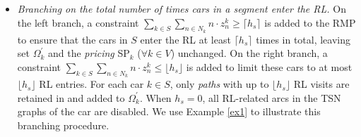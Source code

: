 \documentclass[12pt]{article}
\begin{document}




\begin{itemize}
    \item \textit{Branching on the total number of times cars in a segment enter the RL.} On the left branch, a constraint $\sum_{k\in S}{\sum_{n\in N_k}{n\cdot z^k_n}}\geqslant \lceil h_s\rceil$ is added to the RMP to ensure that the cars in $S$ enter the RL at least $\lceil h_s\rceil$ times in total, leaving set $\Omega^{\prime}_{k}$ and the \textit{pricing} SP$_k$ ($\forall k\in V$) unchanged. On the right branch, a constraint $\sum_{k\in S}{\sum_{n\in N_k}{n\cdot z^k_n}}\leqslant \lfloor h_s\rfloor$ is added to limit these cars to at most $\lfloor h_s \rfloor$ RL entries. For each car $k\in S$, only \textit{paths} with up to $\lfloor h_s \rfloor$ RL visits are retained in and added to $\Omega^{\prime}_{k}$. When $h_s=0$, all RL-related arcs in the TSN graphs of the car are disabled. We use Example \ref{ex1} to illustrate this branching procedure.
\end{itemize}
\end{document}
